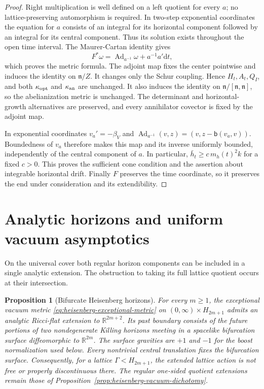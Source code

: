 \documentclass[10pt,a4paper]{article}
\numberwithin{equation}{section}
\newtheorem{proposition}[theorem]{Proposition}
\theoremstyle{definition}
\theoremstyle{remark}
\newcommand{\dd}{\mathrm d}
\newcommand{\Ad}{\operatorname{Ad}}
\begin{document}
\begin{proof}
Right multiplication is well defined on a left quotient for every $a$;
no lattice-preserving automorphism is required.
In two-step exponential coordinates the equation for $a$ consists
of an integral for its horizontal component followed by an integral
for its central component.
Thus its solution exists throughout the open time interval.
The Maurer-Cartan identity gives
\[
 F^*\omega=\Ad_{a^{-1}}\omega+a^{-1}a'\dd t,
\]
which proves the metric formula.
The adjoint map fixes the center pointwise and induces the identity
on $\mathfrak n/Z$.
It changes only the Schur coupling.
Hence $H_t,A_t,Q_I$, and both
$\kappa_{\rm opt}$ and $\kappa_{\rm an}$ are unchanged.
It also induces the identity on
$\mathfrak n/[\mathfrak n,\mathfrak n]$, so the abelianization metric
is unchanged.
The determinant and horizontal-growth alternatives are preserved,
and every annihilator covector is fixed by the adjoint map.

In exponential coordinates $v_a'=-\beta_V$ and
$\Ad_{a^{-1}}(v,z)=(v,z-\mathsf b(v_a,v))$.
Boundedness of $v_a$ therefore makes this map and its inverse
uniformly bounded, independently of the central component of $a$.
In particular, $\bar h_t\ge c\,m_h(t)^2k$ for a fixed $c>0$.
This proves the sufficient cone condition and the assertion about
integrable horizontal drift.
Finally $F$ preserves the time coordinate, so it preserves the end
under consideration and its extendibility.
\end{proof}

\section{Analytic horizons and uniform vacuum asymptotics}\label{app:heisenberg-bifurcate}


On the universal cover both regular horizon components can be included
in a single analytic extension.  The obstruction to taking its full
lattice quotient occurs at their intersection.

\begin{proposition}[Bifurcate Heisenberg horizons]
\label{prop:heisenberg-bifurcate}
For every $m\ge1$, the exceptional vacuum metric
\eqref{eq:heisenberg-exceptional-metric} on
$(0,\infty)\times H_{2m+1}$ admits an analytic Ricci-flat extension
to $\mathbb R^{2m+2}$.  Its past boundary consists of the future
portions of two nondegenerate Killing horizons meeting in a spacelike
bifurcation surface diffeomorphic to $\mathbb R^{2m}$.  The surface
gravities are $+1$ and $-1$ for the boost normalization used below.
Every nontrivial central translation fixes the bifurcation surface.
Consequently, for a lattice $\Gamma<H_{2m+1}$, the extended lattice
action is not free or properly discontinuous there.  The regular
one-sided quotient extensions remain those of
Proposition~\ref{prop:heisenberg-vacuum-dichotomy}.
\end{proposition}
\end{document}
